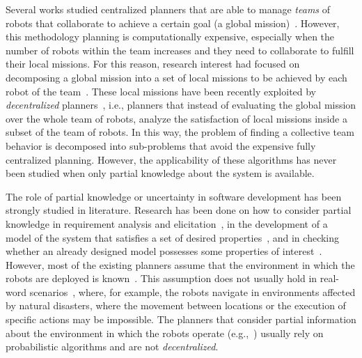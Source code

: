 Several works studied centralized planners that are able to manage \emph{teams} of robots that collaborate to achieve a certain goal (a global mission)~\cite{kloetzer2011multi,quottrup2004multi}.
However, this methodology planning is computationally expensive, especially when the number of robots within the team increases %
and they need to collaborate to fulfill their local missions.
For this reason, research interest had focused on decomposing a global mission into a set of local missions to be achieved by each robot of the team~\cite{schillinger2016decomposition,guo2015multi,tumova2016multi}. 
These local missions have been recently exploited by \emph{decentralized} planners~\cite{tumova2016multi}, i.e., planners that instead of evaluating the global mission over the whole team of robots, analyze the satisfaction of local missions inside a subset of the team of robots. 
In this way, the problem of finding a collective team behavior is decomposed into sub-problems that avoid the expensive fully centralized planning. 
However, the applicability of these algorithms has never been studied when only partial knowledge about the system is available.



The role of partial knowledge or uncertainty  in software development has been strongly studied in literature.
Research has been done on how to consider partial knowledge in requirement analysis and elicitation~\cite{menghi2017integrating,menghi2017cover,letier2008deriving}, in the development of a model of the system that satisfies a set of desired properties~\cite{uchitel2009synthesis,uchitel2013supporting,famelis2012partial,albarghouthi2012under,Bernasconi2017}, and in checking   whether an  already designed model possesses some properties of interest~\cite{menghi2016dealing,bruns1999model,chechik2004multi}.
However, most of the existing planners assume that the environment in which the robots are deployed is known~\cite{7139412}. 
This assumption does not usually hold in real-word scenarios~\cite{lahijanian2016iterative},  where, for example,  the robots navigate in environments affected by natural disasters, where the movement between locations or the execution of specific actions may be impossible. %
The planners that consider  partial information about the environment in which the robots operate (e.g.,~\cite{roy2006planning,du2012robot,diaz2001exploring}) usually rely on probabilistic algorithms and are not  \emph{decentralized}.

